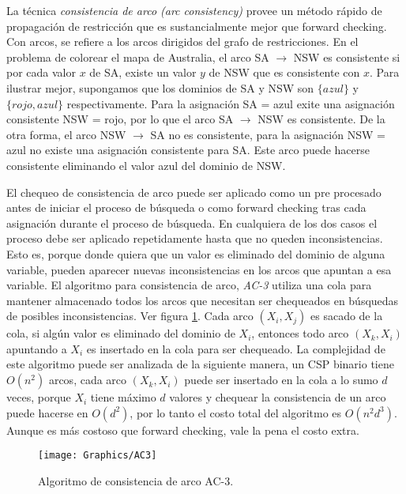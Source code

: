 La t\'ecnica \emph{consistencia de arco (arc consistency)} provee un m\'etodo r\'apido de propagaci\'on de restricci\'on que es sustancialmente mejor que forward checking. Con arcos, se refiere a los arcos dirigidos del grafo de restricciones. En el problema de colorear el mapa de Australia, el arco SA $\rightarrow$ NSW es consistente si por cada valor $x$ de SA, existe un valor $y$ de NSW que es consistente con $x$. Para ilustrar mejor, supongamos que los dominios de SA y NSW son $\{azul\}$ y $\{rojo, azul\}$ respectivamente. Para la asignaci\'on SA = azul exite una asignaci\'on consistente NSW = rojo, por lo que el arco SA $\rightarrow$ NSW es consistente. De la otra forma, el arco NSW $\rightarrow$ SA no es consistente, para la asignaci\'on NSW = azul no existe una asignaci\'on consistente para SA. Este arco puede hacerse consistente eliminando el valor azul del dominio de NSW.

El chequeo de consistencia de arco puede ser aplicado como un pre procesado antes de iniciar el proceso de b\'usqueda o como forward checking tras cada asignaci\'on durante el proceso de b\'usqueda. En cualquiera de los dos casos el proceso debe ser aplicado repetidamente hasta que no queden inconsistencias. Esto es, porque donde quiera que un valor es eliminado del dominio de alguna variable, pueden aparecer nuevas inconsistencias en los arcos que apuntan a esa variable. El algoritmo para consistencia de arco, \emph{AC-3} utiliza una cola para mantener almacenado todos los arcos que necesitan ser chequeados en b\'usquedas de posibles inconsistencias. Ver figura \ref{AC3}. Cada arco $(X_{i},X_{j})$ es sacado de la cola, si alg\'un valor es eliminado del dominio de $X_{i}$, entonces todo arco $(X_{k},X_{i})$ apuntando a $X_{i}$ es insertado en la cola para ser chequeado. La complejidad de este algoritmo puede ser analizada de la siguiente manera, un CSP binario tiene $O(n^{2})$ arcos, cada arco $(X_{k},X_{i})$ puede ser insertado en la cola a lo sumo $d$ veces, porque $X_{i}$ tiene m\'aximo $d$ valores y chequear la consistencia de un arco puede hacerse en $O(d^{2})$, por lo tanto el costo total del algoritmo es $O(n^{2}d^{3})$. Aunque es m\'as costoso que forward checking, vale la pena el costo extra.

\begin{figure}
	\begin{center}
		\texttt{[image: Graphics/AC3]}
		\caption{Algoritmo de consistencia de arco AC-3.}
		\label{AC3}
	\end{center}	
\end{figure}

